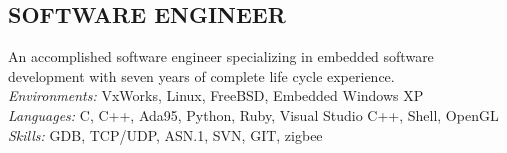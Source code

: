 \documentclass[line]{res}
\begin{document}
\address{San Mateo, CA}
\address{mathew.prokos@gmail.com}

\begin{resume}
\section{SOFTWARE ENGINEER}
    \vspace{1mm}
    An accomplished software engineer specializing in embedded software development with seven years of complete life cycle experience.\\

    \vspace{-5mm}
    {\sl Environments:} VxWorks, Linux, FreeBSD, Embedded Windows XP\\
    {\sl Languages:} C, C++, Ada95, Python, Ruby, Visual Studio C++, Shell, OpenGL\\
    {\sl Skills:} GDB, TCP/UDP, ASN.1, SVN, GIT, zigbee\\     


\end{resume}
\end{document}
